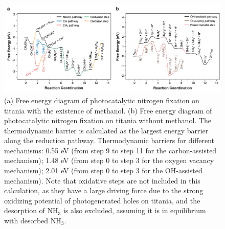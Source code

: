 \begin{figure}
    \centering
    \includegraphics[width=\linewidth]{figures/proposal_figures/Fig3_10_23_23.jpg}
    \caption{(a) Free energy diagram of photocatalytic nitrogen fixation on titania with the existence of methanol. (b) Free energy diagram of photocatalytic nitrogen fixation on titania without methanol. The thermodynamic barrier is calculated as the largest energy barrier along the reduction pathway. Thermodynamic barriers for different mechanisms: 0.55 eV (from step 9 to step 11 for the carbon-assisted mechanism); 1.48 eV (from step 0 to step 3 for the oxygen vacancy mechanism); 2.01 eV (from step 0 to step 3 for the OH-assisted mechanism). Note that oxidative steps are not included in this calculation, as they have a large driving force due to the strong oxidizing potential of photogenerated holes on titania, and the desorption of NH$_3$ is also excluded, assuming it is in equilibrium with desorbed NH$_3$.}
    \label{fig:BEEF_full_fig}
\end{figure}

